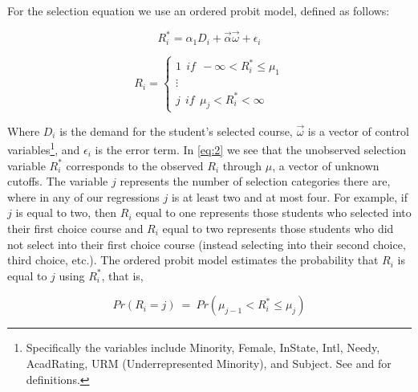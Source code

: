 For the selection equation we use an ordered probit model, defined as follows:

\setlength{\belowdisplayskip}{5pt} \setlength{\belowdisplayshortskip}{1pt}
\setlength{\abovedisplayskip}{-6pt} \setlength{\abovedisplayshortskip}{1pt}

\begin{equation}\label{eq:1}
R_{i}^{*} = \alpha_{1} D_{i} + \overrightarrow{\alpha} \overrightarrow{\omega} + \epsilon_{i}
\end{equation}

\setlength{\belowdisplayskip}{11pt} \setlength{\belowdisplayshortskip}{1pt}
\setlength{\abovedisplayskip}{-4pt} \setlength{\abovedisplayshortskip}{1pt}

\begin{equation}\label{eq:2}
R_{i} = 
\begin{cases}
  1 \ \ if \ \ - \infty < R_{i}^{*} \leq \mu_{1} \\
  \vdots \\
  j \ \ if \ \ \mu_{j} < R_{i}^{*} < \infty
\end{cases}
\end{equation}

Where $D_{i}$ is the demand for the student's selected course, $\overrightarrow{\omega}$ is a vector of control variables\footnote{Specifically the variables include Minority, Female, InState, Intl, Needy, AcadRating, URM (Underrepresented Minority), and Subject. See  and  for definitions.}, and $\epsilon_{i}$ is the error term. 
In \eqref{eq:2} we see that the unobserved selection variable $R_{i}^{*}$ corresponds to the observed $R_{i}$ through $\mu$, a vector of unknown cutoffs. 
The variable $j$ represents the number of selection categories there are, where in any of our regressions $j$ is at least two and at most four. 
For example, if $j$ is equal to two, then $R_{i}$ equal to one represents those students who selected into their first choice course and $R_{i}$ equal to two represents those students who did not select into their first choice course (instead selecting into their second choice, third choice, etc.). 
The ordered probit model estimates the probability that $R_{i}$ is equal to $j$ using $R_{i}^{*}$, that is, 

\setlength{\belowdisplayskip}{5pt} \setlength{\belowdisplayshortskip}{1pt}
\setlength{\abovedisplayskip}{-4pt} \setlength{\abovedisplayshortskip}{1pt}

\begin{equation}\label{eq:3}
Pr(R_{i} = j) \ = \ Pr(\mu_{j-1} < R_{i}^{*} \leq \mu_{j})
\end{equation}

